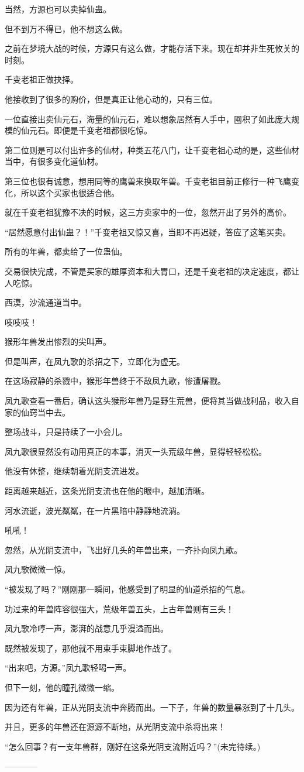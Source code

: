 \begin{this_body}
当然，方源也可以卖掉仙蛊。

但不到万不得已，他不想这么做。

之前在梦境大战的时候，方源只有这么做，才能存活下来。现在却并非生死攸关的时刻。

千变老祖正做抉择。

他接收到了很多的购价，但是真正让他心动的，只有三位。

一位直接出卖仙元石，海量的仙元石，难以想象居然有人手中，囤积了如此庞大规模的仙元石。即便是千变老祖都很吃惊。

第二位则是可以付出许多的仙材，种类五花八门，让千变老祖心动的是，这些仙材当中，有很多变化道仙材。

第三位也很有诚意，想用同等的鹰兽来换取年兽。千变老祖目前正修行一种飞鹰变化，所以这个买家也很适合他。

就在千变老祖犹豫不决的时候，这三方卖家中的一位，忽然开出了另外的高价。

“居然愿意付出仙蛊？！”千变老祖又惊又喜，当即不再迟疑，答应了这笔买卖。

所有的年兽，都卖给了一位蛊仙。

交易很快完成，不管是买家的雄厚资本和大胃口，还是千变老祖的决定速度，都让人吃惊。

西漠，沙流通道当中。

吱吱吱！

猴形年兽发出惨烈的尖叫声。

但是叫声，在凤九歌的杀招之下，立即化为虚无。

在这场寂静的杀戮中，猴形年兽终于不敌凤九歌，惨遭屠戮。

凤九歌查看一番后，确认这头猴形年兽乃是野生荒兽，便将其当做战利品，收入自家的仙窍当中去。

整场战斗，只是持续了一小会儿。

凤九歌很显然没有动用真正的本事，消灭一头荒级年兽，显得轻轻松松。

他没有休整，继续朝着光阴支流进发。

距离越来越近，这条光阴支流也在他的眼中，越加清晰。

河水流逝，波光粼粼，在一片黑暗中静静地流淌。

吼吼！

忽然，从光阴支流中，飞出好几头的年兽出来，一齐扑向凤九歌。

凤九歌微微一惊。

“被发现了吗？”刚刚那一瞬间，他感受到了明显的仙道杀招的气息。

功过来的年兽阵容很强大，荒级年兽五头，上古年兽则有三头！

凤九歌冷哼一声，澎湃的战意几乎漫溢而出。

既然被发现了，那他就不用束手束脚地作战了。

“出来吧，方源。”凤九歌轻喝一声。

但下一刻，他的瞳孔微微一缩。

因为还有年兽，正从光阴支流中奔腾而出。一下子，年兽的数量暴涨到了十几头。

并且，更多的年兽还在源源不断地，从光阴支流中杀将出来！

“怎么回事？有一支年兽群，刚好在这条光阴支流附近吗？”(未完待续。)

------------

\end{this_body}

